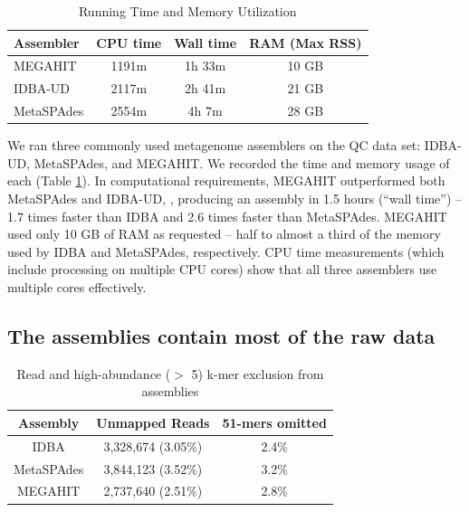\documentclass[11pt]{article}
\begin{document}
 \begin{table}[h]
\caption{Running Time and Memory Utilization}
\centering
\begin{tabular}{|l|c|c|c|}
\hline
\textbf{Assembler} & \textbf{CPU time} & \textbf{Wall time} & \textbf{RAM (Max RSS)} \\ [0.5ex]
\hline
MEGAHIT & 1191m & 1h 33m & 10 GB \\
\hline
IDBA-UD & 2117m & 2h 41m & 21 GB \\
\hline
MetaSPAdes & 2554m & 4h 7m & 28 GB \\
\hline

\end{tabular}
\label{table:time-memory}
\end{table}

We ran three commonly used metagenome assemblers on the QC data set:
IDBA-UD, MetaSPAdes, and MEGAHIT. We recorded the time and memory
usage of each (Table \ref{table:time-memory}).  In computational
requirements, MEGAHIT outperformed both MetaSPAdes and IDBA-UD,
, producing an assembly in 1.5 hours (``wall time'') --
1.7 times faster than IDBA and 2.6 times faster than MetaSPAdes.
MEGAHIT used only 10 GB of RAM as requested -- half to almost a
third of the memory used by IDBA and MetaSPAdes, respectively.
CPU time measurements (which include processing on multiple CPU cores)
show that all three assemblers use multiple cores effectively.


\subsection*{The assemblies contain most of the raw data}






\begin{table}[!h]
\centering
\caption{Read and high-abundance ($>$ 5) k-mer exclusion from assemblies}
\begin{tabular}{|c|c|c|}\hline
  \textbf{Assembly} & \textbf{Unmapped Reads} & \textbf {51-mers omitted}
  \\ \hline
IDBA &3,328,674 (3.05\%)&  2.4\% \\ \hline
MetaSPAdes &3,844,123 (3.52\%) &  3.2\% \\ \hline
MEGAHIT &2,737,640 (2.51\%) &   2.8\% \\ \hline
\end{tabular}
\label{table:reads-kmers}
\end{table}
\end{document}
